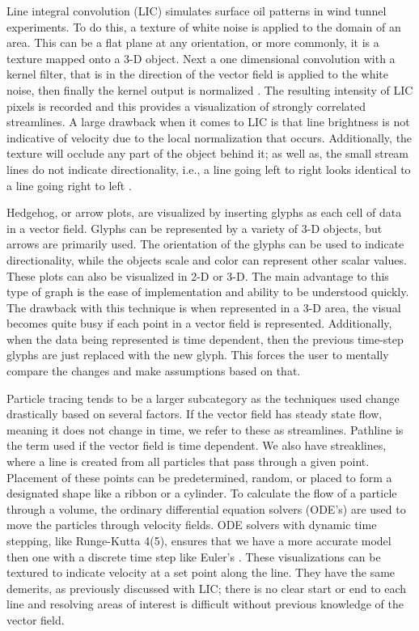 Line integral convolution (LIC) simulates surface oil patterns in wind tunnel experiments. To do this, a texture of white noise is applied to the domain of an area. This can be a flat plane at any orientation, or more commonly, it is a texture mapped onto a 3-D object. Next a one dimensional convolution with a kernel filter, that is in the direction of the vector field is applied to the white noise, then finally the kernel output is normalized \cite{Cabral1993}. The resulting intensity of LIC pixels is recorded and this provides a visualization of strongly correlated streamlines. A large drawback when it comes to LIC is that line brightness is not indicative of velocity due to the local normalization that occurs. Additionally, the texture will occlude any part of the object behind it; as well as, the small stream lines do not indicate directionality, i.e., a line going left to right looks identical to a line going right to left \cite{LIC}. \par

Hedgehog, or arrow plots, are visualized by inserting glyphs as each cell of data in a vector field. Glyphs can be represented by a variety of 3-D objects, but arrows are primarily used. The orientation of the glyphs can be used to indicate directionality, while the objects scale and color can represent other scalar values. These plots can also be visualized in 2-D or 3-D. The main advantage to this type of graph is the ease of implementation and ability to be understood quickly. The drawback with this technique is when represented in a 3-D area, the visual becomes quite busy if each point in a vector field is represented. Additionally, when the data being represented is time dependent, then the previous time-step glyphs are just replaced with the new glyph. This forces the user to mentally compare the changes and make assumptions based on that. \par

Particle tracing tends to be a larger subcategory as the techniques used change drastically based on several factors. If the vector field has steady state flow, meaning it does not change in time, we refer to these as streamlines. Pathline is the term used if the vector field is time dependent. We also have streaklines, where a line is created from all particles that pass through a given point. Placement of these points can be predetermined, random, or placed to form a designated shape like a ribbon or a cylinder. To calculate the flow of a particle through a volume, the ordinary differential equation solvers (ODE’s) are used to move the particles through velocity fields. ODE solvers with dynamic time stepping, like Runge-Kutta 4(5), ensures that we have a more accurate model then one with a discrete time step like Euler’s \cite{Teitzel1997}. These visualizations can be textured to indicate velocity at a set point along the line. They have the same demerits, as previously discussed with LIC; there is no clear start or end to each line and resolving areas of interest is difficult without previous knowledge of the vector field. \par

